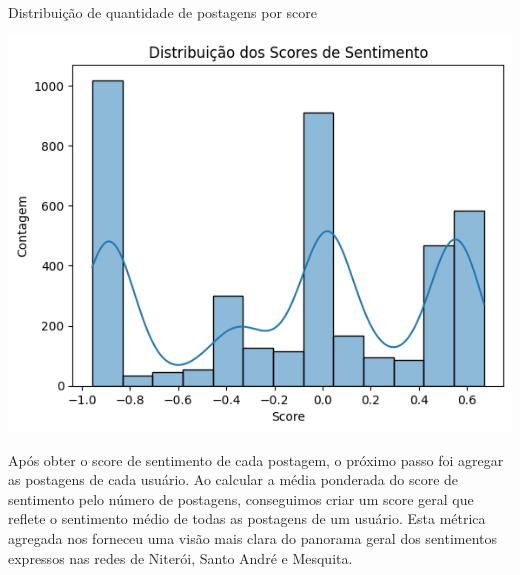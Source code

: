 \begin{quadro}[!htb]
	\caption{Distribuição de quantidade de postagens por score}
	\label{fig:score_distribution}
	\centering
	\includegraphics[scale=0.90]{images/score_distribution.png}
	\fautor
\end{quadro}

Após obter o score de sentimento de cada postagem, o próximo passo foi agregar as postagens de cada usuário. Ao calcular a média ponderada do score de sentimento pelo número de postagens, conseguimos criar um score geral que reflete o sentimento médio de todas as postagens de um usuário. Esta métrica agregada nos forneceu uma visão mais clara do panorama geral dos sentimentos expressos nas redes de Niterói, Santo André e Mesquita.

